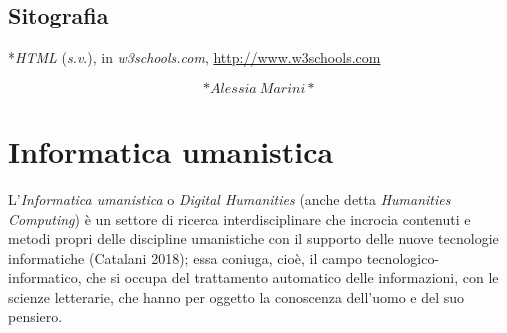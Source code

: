 \documentclass[
  b5paper,
  twoside,
  12pt,
  chapterprefix=false,
  bibliography=totocnumbered,
  parskip=false]{scrbook}
\begin{document}
\hypertarget{sitografia-17}{%
\section*{Sitografia}\label{sitografia-17}}

*\emph{HTML} (\emph{s.v}.), in \emph{w3schools.com},
\url{http://www.w3schools.com}

\[*Alessia~Marini*\]

\hypertarget{informatica-umanistica}{%
\chapter{Informatica umanistica}\label{informatica-umanistica}}

L'\emph{Informatica umanistica} o \emph{Digital Humanities} (anche detta
\emph{Humanities Computing}) è un settore di ricerca interdisciplinare che
incrocia contenuti e metodi propri delle discipline umanistiche con il
supporto delle nuove tecnologie informatiche (Catalani 2018); essa
coniuga, cioè, il campo tecnologico-informatico, che si occupa del
trattamento automatico delle informazioni, con le scienze letterarie,
che hanno per oggetto la conoscenza dell'uomo e del suo pensiero.
\end{document}

